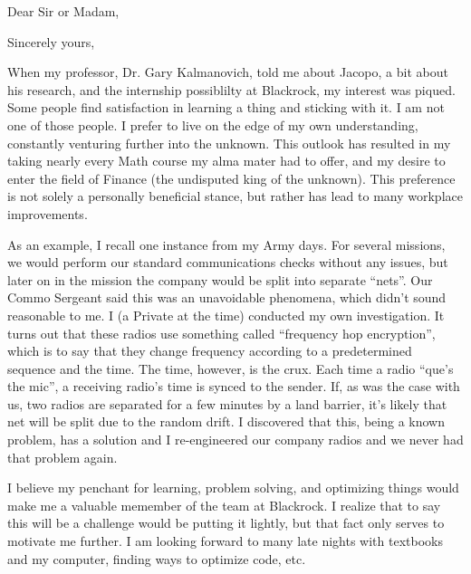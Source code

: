 \documentclass[11pt,a4paper,sans]{moderncv} %
\begin{document}


\date{\today} %
\opening{Dear Sir or Madam,} %
\closing{Sincerely yours,} %

\makelettertitle %

When my professor, Dr. Gary Kalmanovich, told me about Jacopo, a bit about his research, and the internship possiblilty at Blackrock, my interest was piqued. Some people find satisfaction in learning a thing and sticking with it. I am not one of those people. I prefer to live on the edge of my own understanding, constantly venturing further into the unknown. This outlook has resulted in my taking nearly every Math course my alma mater had to offer, and my desire to enter the field of Finance (the undisputed king of the unknown). This preference is not solely a personally beneficial stance, but rather has lead to many workplace improvements.

As an example, I recall one instance from my Army days. For several missions, we would perform our standard communications checks without any issues, but later on in the mission the company would be split into separate ``nets''. Our Commo Sergeant said this was an unavoidable phenomena, which didn't sound reasonable to me. I (a Private at the time) conducted my own investigation. It turns out that these radios use something called ``frequency hop encryption'', which is to say that they change frequency according to a predetermined sequence and the time. The time, however, is the crux. Each time a radio ``que's the mic'', a receiving radio's time is synced to the sender. If, as was the case with us, two radios are separated for a few minutes by a land barrier, it's likely that net will be split due to the random drift. I discovered that this, being a known problem, has a solution and I re-engineered our company radios and we never had that problem again.

I believe my penchant for learning, problem solving, and optimizing things would make me a valuable memember of the team at Blackrock. I realize that to say this will be a challenge would be putting it lightly, but that fact only serves to motivate me further. I am looking forward to many late nights with textbooks and my computer, finding ways to optimize code, etc.
\end{document}
